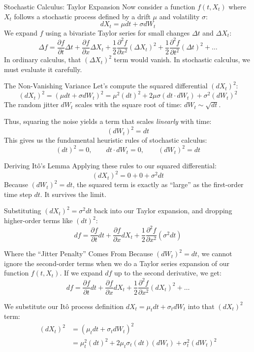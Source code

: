 \documentclass{beamer}
\begin{document}
\begin{frame}{Stochastic Calculus: Taylor Expansion}
Now consider a function $f(t, X_t)$ where $X_t$ follows a stochastic process defined by a drift $\mu$ and volatility $\sigma$:
\[ dX_t = \mu dt + \sigma dW_t \]
We expand $f$ using a bivariate Taylor series for small changes $\Delta t$ and $\Delta X_t$:
\[
\Delta f = \frac{\partial f}{\partial t}\Delta t + \frac{\partial f}{\partial x}\Delta X_t + \frac{1}{2}\frac{\partial^2 f}{\partial x^2}(\Delta X_t)^2 + \frac{1}{2}\frac{\partial^2 f}{\partial t^2}(\Delta t)^2 + \dots
\]
In ordinary calculus, that $(\Delta X_t)^2$ term would vanish. In stochastic calculus, we must evaluate it carefully.
\end{frame}

\begin{frame}{The Non-Vanishing Variance}
Let's compute the squared differential $(dX_t)^2$:
\[
(dX_t)^2 = (\mu dt + \sigma dW_t)^2 = \mu^2(dt)^2 + 2\mu\sigma(dt \cdot dW_t) + \sigma^2(dW_t)^2
\]
The random jitter $dW_t$ scales with the square root of time: $dW_t \sim \sqrt{dt}$.
\medskip

Thus, squaring the noise yields a term that scales \textit{linearly} with time:
\[ (dW_t)^2 = dt \]
This gives us the fundamental heuristic rules of stochastic calculus:
\[ (dt)^2 = 0, \qquad dt \cdot dW_t = 0, \qquad (dW_t)^2 = dt \]
\end{frame}

\begin{frame}{Deriving It\^o's Lemma}
Applying these rules to our squared differential:
\[
(dX_t)^2 = 0 + 0 + \sigma^2 dt
\]
Because $(dW_t)^2 = dt$, the squared term is exactly as ``large'' as the first-order time step $dt$. It survives the limit.
\medskip

Substituting $(dX_t)^2 = \sigma^2 dt$ back into our Taylor expansion, and dropping higher-order terms like $(dt)^2$:
\[
df = \frac{\partial f}{\partial t}dt + \frac{\partial f}{\partial x}dX_t + \frac{1}{2}\frac{\partial^2 f}{\partial x^2}(\sigma^2 dt)
\]
\end{frame}

\begin{frame}{Where the ``Jitter Penalty'' Comes From}
Because $(dW_t)^2 = dt$, we cannot ignore the second-order terms when we do a Taylor series expansion of our function $f(t, X_t)$.
If we expand $df$ up to the second derivative, we get:
\[ df = \frac{\partial f}{\partial t}dt + \frac{\partial f}{\partial x}dX_t + \frac{1}{2}\frac{\partial^2 f}{\partial x^2}(dX_t)^2 + \dots \]

We substitute our It\^o process definition $dX_t = \mu_t dt + \sigma_t dW_t$ into that $(dX_t)^2$ term:
\begin{align*}
(dX_t)^2 &= (\mu_t dt + \sigma_t dW_t)^2 \\
         &= \mu_t^2(dt)^2 + 2\mu_t\sigma_t(dt)(dW_t) + \sigma_t^2(dW_t)^2
\end{align*}
\end{frame}
\end{document}
